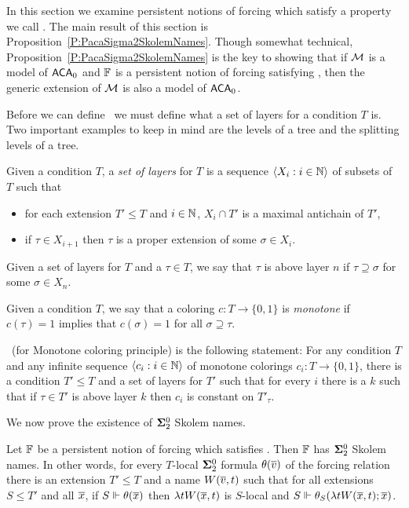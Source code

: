 In this section we examine persistent notions of forcing which satisfy
a property we call \MCP.
The main result of this section is Proposition~\ref{P:PacaSigma2SkolemNames}.
Though somewhat technical, Proposition~\ref{P:PacaSigma2SkolemNames} is the key
to showing that if $\mathcal{M}$ is a model of $\mathsf{ACA}_0$ and $\mathbb{F}$ is a
persistent notion of forcing satisfying \MCP,
then the generic extension of $\mathcal{M}$ is also a model of $\mathsf{ACA}_0$.

Before we can define \MCP\ we must define what a set of layers for a condition $T$ is.
Two important examples to keep in mind are the levels of a tree
and the splitting levels of a tree.

\begin{definition}
Given a condition $T$, a \textit{set of layers} for $T$ is a
sequence $\left\langle X_i:i\in\mathbb{N}\right\rangle$ of subsets of $T$ such that
\begin{itemize}
\item for each extension $T'\leq T$ and $i\in\mathbb{N}$, $X_i\cap T'$ is a maximal antichain of $T'$,
\item if $\tau\in X_{i+1}$ then $\tau$ is a proper extension of some $\sigma\in X_i$.
\end{itemize}
Given a set of layers for $T$ and a $\tau\in T$,
we say that $\tau$ is above layer $n$ if $\tau\supseteq\sigma$
for some $\sigma\in X_n$.
\end{definition}

\begin{definition}
Given a condition $T$, we say that a coloring $c:T\to\{0,1\}$
is \textit{monotone} if $c(\tau)=1$ implies that $c(\sigma)=1$ for
all $\sigma\supseteq\tau$.
\end{definition}

\begin{definition}
\MCP\ (for Monotone coloring principle\index{$\MCP$})
is the following statement:
For any condition $T$ and any infinite sequence $\langle c_i:i\in\mathbb{N}\rangle$ of monotone
colorings $c_i:T\rightarrow \{0,1\}$,
there is a condition $T'\leq T$ and a set of layers for $T'$ such that
for every $i$ there is a $k$ such that if $\tau\in T'$ is above layer $k$
then $c_i$ is constant on $T'_\tau$.
\end{definition}

We now prove the existence of $\mathbf{\Sigma}^0_2$ Skolem names.

\begin{prop}[\ACAo]\label{P:PacaSigma2SkolemNames}
Let $\mathbb{F}$ be a persistent notion of forcing which satisfies \MCP.
Then $\mathbb{F}$ has $\mathbf{\Sigma}^0_2$ Skolem names.
In other words, for every $T$-local $\mathbf{\Sigma}^0_2$ formula $\theta(\overline{v})$ of the
forcing relation there is an extension $T'\leq T$ and a name $W(\overline{v},t)$
such that for all extensions $S\leq T'$ and all $\overline{x}$,
if $S\Vdash\theta(\overline{x})$ then $\lambda tW(\overline{x},t)$
is $S$-local and $S\Vdash\theta_S(\lambda tW(\overline{x},t);\overline{x})$.
\end{prop}

